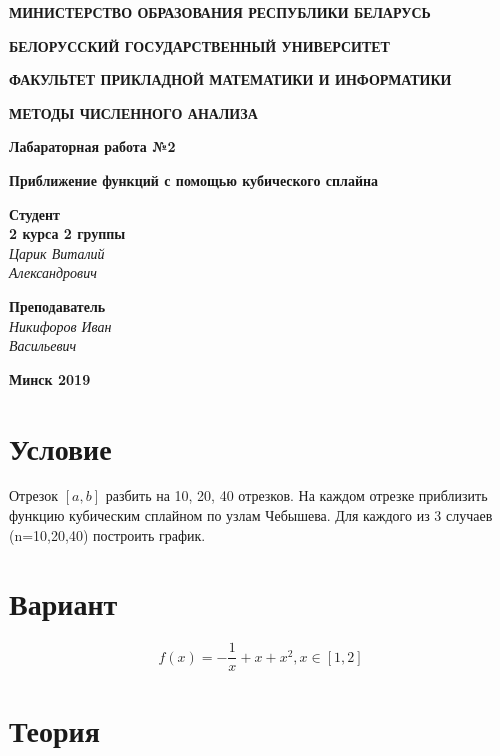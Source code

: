 \documentclass{article}
\begin{document}
\begin{titlepage}



\centerline{\large \bf МИНИСТЕРСТВО ОБРАЗОВАНИЯ РЕСПУБЛИКИ БЕЛАРУСЬ}
\bigskip
\bigskip
\centerline{\large \bf БЕЛОРУССКИЙ ГОСУДАРСТВЕННЫЙ УНИВЕРСИТЕТ}
\bigskip
\bigskip
\centerline{\large \bf ФАКУЛЬТЕТ ПРИКЛАДНОЙ МАТЕМАТИКИ И ИНФОРМАТИКИ}
\vfill
\centerline{\Large \bf МЕТОДЫ ЧИСЛЕННОГО АНАЛИЗА}
\bigskip
\vfill

\centerline{\Large \bf Лабараторная работа №2}
\bigskip
\centerline{\Large \bf Приближение функций с помощью кубического сплайна}
\vfill

\hfill
\begin{minipage}{0.25\textwidth}
	{\large{\bf Студент \\ 2 курса 2 группы} \\
		{\it Царик Виталий \\ Александрович }}
\end{minipage}

\vfill
\hfill
\begin{minipage}{0.25\textwidth}
  {\large{\bf Преподаватель} \\
{\it Никифоров Иван \\ Васильевич}}
\end{minipage}
\vfill
\vfill
\centerline{\Large \bf Минск 2019}

\end{titlepage}

\restoregeometry

\section{Условие}
Отрезок $[a, b]$ разбить на 10, 20, 40 отрезков. На каждом отрезке приблизить функцию кубическим сплайном по узлам Чебышева. Для каждого из 3 случаев (n=10,20,40) построить график.

\section{Вариант}
\begin{equation}
\label{eq:variant}
f(x) = -\frac{1}{x} + x + x^2, x \in [1, 2]
\end{equation}

\section{Теория}
\end{document}
